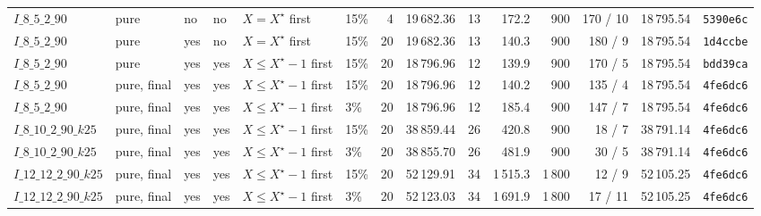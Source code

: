 \begin{table}[!htbp]
{\begin{tabular}{llllllrrrrrrrl}
$I\_8\_5\_2\_90$ & pure & no & no & $X=X^{\star}$ first & 15\% & 4 & 19\,682.36 & 13 & 172.2 & 900 & 170 / 10 & 18\,795.54 & \texttt{5390e6c} \\
$I\_8\_5\_2\_90$ & pure & yes & no & $X=X^{\star}$ first & 15\% & 20 & 19\,682.36 & 13 & 140.3 & 900 & 180 / 9 & 18\,795.54 & \texttt{1d4ccbe} \\
$I\_8\_5\_2\_90$ & pure & yes & yes & $X\le X^{\star}-1$ first & 15\% & 20 & 18\,796.96 & 12 & 139.9 & 900 & 170 / 5 & 18\,795.54 & \texttt{bdd39ca} \\
$I\_8\_5\_2\_90$ & pure, final & yes & yes & $X\le X^{\star}-1$ first & 15\% & 20 & 18\,796.96 & 12 & 140.2 & 900 & 135 / 4 & 18\,795.54 & \texttt{4fe6dc6} \\
$I\_8\_5\_2\_90$ & pure, final & yes & yes & $X\le X^{\star}-1$ first & 3\% & 20 & 18\,796.96 & 12 & 185.4 & 900 & 147 / 7 & 18\,795.54 & \texttt{4fe6dc6} \\
\midrule
$I\_8\_10\_2\_90\_k25$ & pure, final & yes & yes & $X\le X^{\star}-1$ first & 15\% & 20 & 38\,859.44 & 26 & 420.8 & 900 & 18 / 7 & 38\,791.14 & \texttt{4fe6dc6} \\
$I\_8\_10\_2\_90\_k25$ & pure, final & yes & yes & $X\le X^{\star}-1$ first & 3\% & 20 & 38\,855.70 & 26 & 481.9 & 900 & 30 / 5 & 38\,791.14 & \texttt{4fe6dc6} \\
\midrule
$I\_12\_12\_2\_90\_k25$ & pure, final & yes & yes & $X\le X^{\star}-1$ first & 15\% & 20 & 52\,129.91 & 34 & 1\,515.3 & 1\,800 & 12 / 9 & 52\,105.25 & \texttt{4fe6dc6} \\
$I\_12\_12\_2\_90\_k25$ & pure, final & yes & yes & $X\le X^{\star}-1$ first & 3\% & 20 & 52\,123.03 & 34 & 1\,691.9 & 1\,800 & 17 / 11 & 52\,105.25 & \texttt{4fe6dc6} \\
\bottomrule
\end{tabular}}
\end{table}

